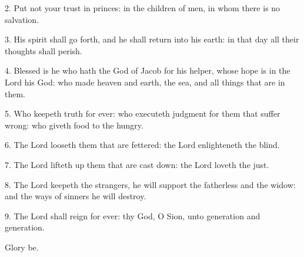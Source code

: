 
2. Put not your trust in princes: in the children of men, in whom there is no salvation.

3. His spirit shall go forth, and he shall return into his earth: in that day all their thoughts shall perish.

4. Blessed is he who hath the God of Jacob for his helper, whose hope is in the Lord his God: who made heaven and earth, the sea, and all things that are in them.

5. Who keepeth truth for ever: who executeth judgment for them that suffer wrong: who giveth food to the hungry.

6. The Lord looseth them that are fettered: the Lord enlighteneth the blind.

7. The Lord lifteth up them that are cast down: the Lord loveth the just.

8. The Lord keepeth the strangers, he will support the fatherless and the widow: and the ways of sinners he will destroy.

9. The Lord shall reign for ever: thy God, O Sion, unto generation and generation. 

Glory be.